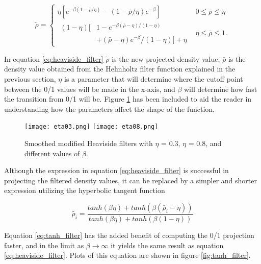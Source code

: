 \documentclass[../main.tex]{subfiles}
\begin{document}
\begin{equation}
  \tilde{\rho} = \begin{cases}
    \eta [e^{-\beta (1 - \bar{\rho} / \eta)} - (1 - \bar{\rho} / \eta) e^{- \beta}] & 0 \leq \bar{\rho} \leq \eta\\ 
  \begin{split}
    (1-\eta)[& 1 - e^{-\beta (\bar{\rho} - \eta) / (1 - \eta)} \\ 
             & + (\bar{\rho} - \eta) e^{- \beta} / (1 - \eta )] + \eta
  \end{split} & \eta \le \bar{\rho} \leq 1.
\end{cases} 
  \label{eq:heaviside_filter}
\end{equation}

In equation \ref{eq:heaviside_filter} $\tilde{\rho}$ is the new projected density value, $\bar{\rho}$ is the density value obtained from the Helmholtz filter function explained in the previous section, $\eta$ is a parameter that will determine where the cutoff point between the 0/1 values will be made in the x-axis, and $\beta$ will determine how fast the transition from 0/1 will be. Figure \ref{fig:heaviside_filter} has been included to aid the reader in understanding how the parameters affect the shape of the function.

\begin{figure}
  \texttt{[image: eta03.png]} \hfill
  \texttt{[image: eta08.png]} \hfill
  \caption{Smoothed modified Heaviside filters with $\eta$ = 0.3, $\eta$ = 0.8, and different values of $\beta$.}\label{fig:heaviside_filter}
\end{figure}

Although the expression in equation \ref{eq:heaviside_filter} is successful in projecting the filtered density values, it can be replaced by a simpler and shorter expression utilizing the hyperbolic tangent function \cite{wangProjectionMethodsConvergence2011a}

\begin{equation}
  {\tilde{\rho_i}} = \frac{tanh(\beta \eta) + tanh(\beta(\bar{\rho}_i - \eta))}{tanh(\beta \eta) + tanh(\beta (1 - \eta))} 
  \label{eq:tanh_filter}
\end{equation}

Equation \ref{eq:tanh_filter} has the added benefit of computing the 0/1 projection faster, and in the limit as $\beta \xrightarrow {} \infty$ it yields the same result as equation \ref{eq:heaviside_filter}. Plots of this equation are shown in figure \ref{fig:tanh_filter}.
\end{document}
